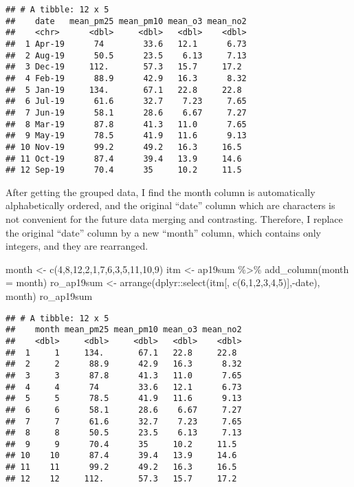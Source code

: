 \documentclass[
]{article}
\newenvironment{Shaded}{\begin{snugshade}}{\end{snugshade}}
\newcommand{\AttributeTok}[1]{\textcolor[rgb]{0.77,0.63,0.00}{#1}}
\newcommand{\DecValTok}[1]{\textcolor[rgb]{0.00,0.00,0.81}{#1}}
\newcommand{\FunctionTok}[1]{\textcolor[rgb]{0.00,0.00,0.00}{#1}}
\newcommand{\NormalTok}[1]{#1}
\newcommand{\OtherTok}[1]{\textcolor[rgb]{0.56,0.35,0.01}{#1}}
\newcommand{\SpecialCharTok}[1]{\textcolor[rgb]{0.00,0.00,0.00}{#1}}
\begin{document}
\begin{verbatim}
## # A tibble: 12 x 5
##    date   mean_pm25 mean_pm10 mean_o3 mean_no2
##    <chr>      <dbl>     <dbl>   <dbl>    <dbl>
##  1 Apr-19      74        33.6   12.1      6.73
##  2 Aug-19      50.5      23.5    6.13     7.13
##  3 Dec-19     112.       57.3   15.7     17.2 
##  4 Feb-19      88.9      42.9   16.3      8.32
##  5 Jan-19     134.       67.1   22.8     22.8 
##  6 Jul-19      61.6      32.7    7.23     7.65
##  7 Jun-19      58.1      28.6    6.67     7.27
##  8 Mar-19      87.8      41.3   11.0      7.65
##  9 May-19      78.5      41.9   11.6      9.13
## 10 Nov-19      99.2      49.2   16.3     16.5 
## 11 Oct-19      87.4      39.4   13.9     14.6 
## 12 Sep-19      70.4      35     10.2     11.5
\end{verbatim}

After getting the grouped data, I find the month column is automatically
alphabetically ordered, and the original ``date'' column which are
characters is not convenient for the future data merging and
contrasting. Therefore, I replace the original ``date'' column by a new
``month'' column, which contains only integers, and they are rearranged.

\begin{Shaded}
\begin{Highlighting}[]
\NormalTok{month }\OtherTok{\textless{}{-}} \FunctionTok{c}\NormalTok{(}\DecValTok{4}\NormalTok{,}\DecValTok{8}\NormalTok{,}\DecValTok{12}\NormalTok{,}\DecValTok{2}\NormalTok{,}\DecValTok{1}\NormalTok{,}\DecValTok{7}\NormalTok{,}\DecValTok{6}\NormalTok{,}\DecValTok{3}\NormalTok{,}\DecValTok{5}\NormalTok{,}\DecValTok{11}\NormalTok{,}\DecValTok{10}\NormalTok{,}\DecValTok{9}\NormalTok{)}
\NormalTok{itm }\OtherTok{\textless{}{-}}\NormalTok{ ap19sum }\SpecialCharTok{\%\textgreater{}\%} \FunctionTok{add\_column}\NormalTok{(}\AttributeTok{month =}\NormalTok{ month)}
\NormalTok{ro\_ap19sum }\OtherTok{\textless{}{-}} \FunctionTok{arrange}\NormalTok{(dplyr}\SpecialCharTok{::}\FunctionTok{select}\NormalTok{(itm[, }\FunctionTok{c}\NormalTok{(}\DecValTok{6}\NormalTok{,}\DecValTok{1}\NormalTok{,}\DecValTok{2}\NormalTok{,}\DecValTok{3}\NormalTok{,}\DecValTok{4}\NormalTok{,}\DecValTok{5}\NormalTok{)],}\SpecialCharTok{{-}}\NormalTok{date), month)}
\NormalTok{ro\_ap19sum}
\end{Highlighting}
\end{Shaded}

\begin{verbatim}
## # A tibble: 12 x 5
##    month mean_pm25 mean_pm10 mean_o3 mean_no2
##    <dbl>     <dbl>     <dbl>   <dbl>    <dbl>
##  1     1     134.       67.1   22.8     22.8 
##  2     2      88.9      42.9   16.3      8.32
##  3     3      87.8      41.3   11.0      7.65
##  4     4      74        33.6   12.1      6.73
##  5     5      78.5      41.9   11.6      9.13
##  6     6      58.1      28.6    6.67     7.27
##  7     7      61.6      32.7    7.23     7.65
##  8     8      50.5      23.5    6.13     7.13
##  9     9      70.4      35     10.2     11.5 
## 10    10      87.4      39.4   13.9     14.6 
## 11    11      99.2      49.2   16.3     16.5 
## 12    12     112.       57.3   15.7     17.2
\end{verbatim}
\end{document}
